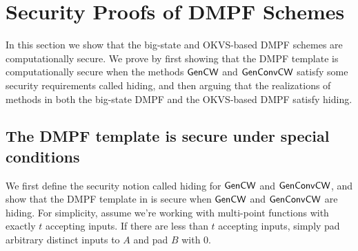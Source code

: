 \section{Security Proofs of DMPF Schemes}\label{sec:security_proof}
In this section we show that the big-state and OKVS-based DMPF schemes are computationally secure. We prove by first showing that the DMPF template is computationally secure when the methods $\sf  GenCW$ and $\sf GenConvCW$ satisfy some security requirements called hiding, and then arguing that the realizations of methods in both the big-state DMPF and the OKVS-based DMPF satisfy hiding. 

\subsection{The DMPF template is secure under special conditions}\label{sec:template_security_proof}
We first define the security notion called hiding for ${\sf Gen}{\sf CW}$ and ${\sf Gen}{\sf Conv}{\sf CW}$, and show that the DMPF template in  is secure when ${\sf Gen}{\sf CW}$ and ${\sf Gen}{\sf Conv}{\sf CW}$ are hiding. For simplicity, assume we're working with multi-point functions with exactly $t$ accepting inputs. If there are less than $t$ accepting inputs, simply pad arbitrary distinct inputs to $A$ and pad $B$ with $0$. 

